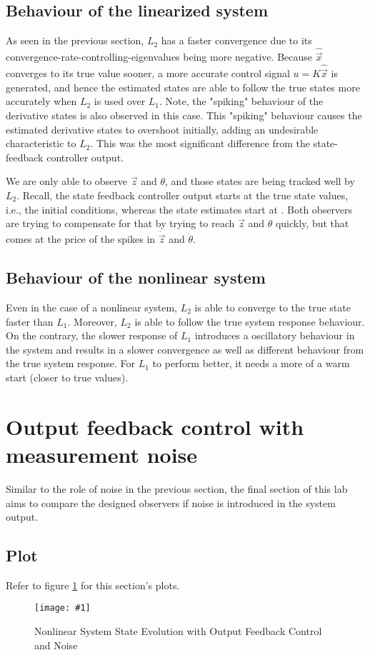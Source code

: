 \documentclass[10pt]{article}
\newcommand{\shrinkimage}[1]{\texttt{[image: \#1]}}
\begin{document}
\subsection{Behaviour of the linearized system}
As seen in the previous section, $L_2$ has a faster convergence due to its convergence-rate-controlling-eigenvalues being more negative. Because $\hat{\vec{x}}$ converges to its true value sooner, a more accurate control signal $u = K\hat{\vec{x}}$ is generated, and hence the estimated states are able to follow the true states more accurately when $L_2$ is used over $L_1$. Note, the "spiking" behaviour of the derivative states is also observed in this case. This "spiking" behaviour causes the estimated derivative states to overshoot initially, adding an undesirable characteristic to $L_2$. This was the most significant difference from the state-feedback controller output. 

We are only able to observe $\vec{z}$ and $\theta$, and those states are being tracked well by $L_2$. Recall, the state feedback controller output starts at the true state values, i.e., the initial conditions, whereas the state estimates start at . Both observers are trying to compensate for that by trying to reach $\vec{z}$ and $\theta$ quickly, but that comes at the price of the spikes in $\dot{\vec{z}}$ and $\dot{\theta}$.

\subsection{Behaviour of the nonlinear system}
Even in the case of a nonlinear system, $L_2$ is able to converge to the true state faster than $L_1$. Moreover, $L_2$ is able to follow the true system response behaviour. On the contrary, the slower response of $L_1$ introduces a oscillatory behaviour in the system and results in a slower convergence as well as different behaviour from the true system response. For $L_1$ to perform better, it needs a more of a warm start (closer to true values). 

\section{Output feedback control with measurement noise}
Similar to the role of noise in the previous section, the final section of this lab aims to compare the designed observers if noise is introduced in the system output. 

\subsection{Plot}
Refer to figure \ref{fig:nlin_noisy_state_est_error_feedback} for this section's plots.
\begin{figure}[h]
    \centering
    \shrinkimage{lab4/figs/nlin_noisy_state_est_error_feedback.pdf}
    \caption{Nonlinear System State Evolution with Output Feedback Control and Noise}
    \label{fig:nlin_noisy_state_est_error_feedback}
\end{figure}
\end{document}
